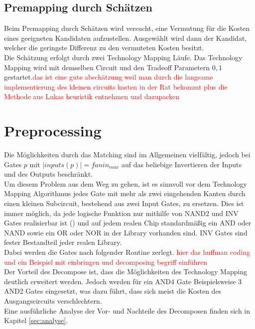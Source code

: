 \documentclass[11pt, a4paper, german]{article}
\newcommand{\TM}{Technology  Mapping }
\begin{document}
 
\subsection{Premapping durch Schätzen}
\label{subsec:neinhierfrnochkeinlabel}
 Beim Premapping durch Schätzen wird versucht, eine Vermutung für die Kosten eines geeigneten Kandidaten aufzustellen. Ausgewählt wird dann der Kandidat, welcher die geringste Differenz zu den vermuteten Kosten besitzt.\\
 Die Schätzung erfolgt durch zwei \TM Läufe. Das \TM wird mit demselben Circuit  und den Tradeoff Parametern $0,1$ gestartet.\textcolor{red}{das ist eine gute abschätzung weil man durch die langsame implementierung des kleinen circuits kosten in der Rat bekommt plus die Methode aus Lukas heuristik entnehmen und dazupacken}


\section{Preprocessing}
Die Möglichkeiten durch das Matching sind im Allgemeinen vielfältig, jedoch bei Gates $p$ mit $|inputs(p)| = fanin_{max}$ auf das beliebige Invertieren der Inputs und des Outputs beschränkt. \\
Um diesem Problem aus dem Weg zu gehen, ist es sinnvoll vor dem \TM Algorithmus jedes Gate mit mehr als zwei eingehenden Kanten durch einen kleinen Subcircuit, bestehend aus zwei Input Gates, zu ersetzen. Dies ist immer möglich, da jede logische Funktion nur mithilfe von NAND2 und INV Gates realisierbar ist (\cite{Post}) und auf jedem realen Chip standardmäßig ein AND oder NAND sowie ein OR oder NOR in der Library vorhanden sind. INV Gates sind fester Bestandteil jeder realen Library.\\
Dabei werden die Gates nach folgender Routine zerlegt. \textcolor{red}{hier das huffman coding und ein Beispiel mit einbringen und decomposing begriff einführen}\\
Der Vorteil des Decompose ist, dass die Möglichkeiten des \TM deutlich erweitert werden. Jedoch werden für ein AND4 Gate Beispielsweise 3 AND2 Gates eingesetzt, was dazu führt, dass sich meist die Kosten des Ausgangscircuits verschlechtern.\\
Eine ausführliche Analyse der Vor- und Nachteile des Decomposen finden sich in Kapitel \ref{sec:analyse}.
	
\end{document}
